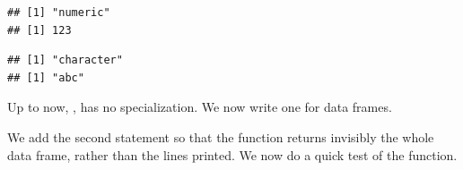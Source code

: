 \documentclass[krantz2]{krantz}\usepackage{knitr}%
\begin{document}
\begin{knitrout}\footnotesize
{}\color{fgcolor}\begin{kframe}
\begin{alltt}
\hlstd{(}\hlstd{)}
\end{alltt}
\begin{verbatim}
## [1] "numeric"
## [1] 123
\end{verbatim}
\begin{alltt}
\hlstd{(}\hlstd{)}
\end{alltt}
\begin{verbatim}
## [1] "character"
## [1] "abc"
\end{verbatim}
\end{kframe}
\end{knitrout}

Up to now, , has no specialization. We now write one for data frames.

\begin{knitrout}\footnotesize
{}\color{fgcolor}\begin{kframe}
\begin{alltt}
 \hlkwb{<-} \hlstd{(}\hlstd{,}  \hlstd{=} \hlopt{:}\hlstd{,} \hlstd{) \{}
\hlstd{\}}
\end{alltt}
\end{kframe}
\end{knitrout}

We add the second statement so that the function returns invisibly the whole data frame, rather than the lines printed. We now do a quick test of the function.
\end{document}
